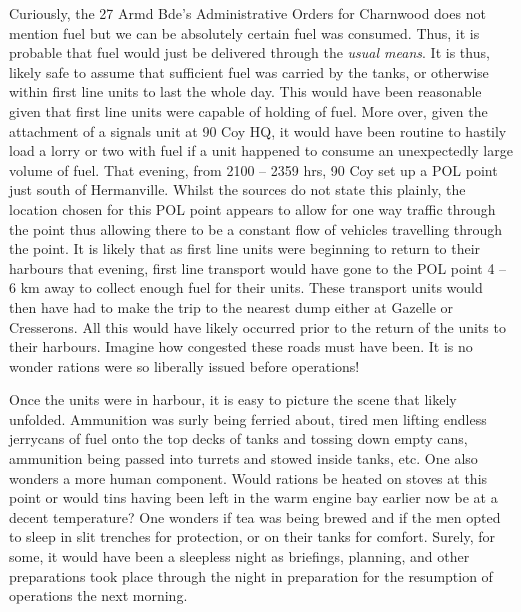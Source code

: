 \documentclass[noraggedright]{turabian-researchpaper}
\begin{document}
Curiously, the 27 Armd Bde's Administrative Orders for Charnwood does not
mention fuel but we can be absolutely certain fuel was consumed.  Thus, it is
probable that fuel would just be delivered through the \textit{usual means}.
It is thus, likely safe to assume that sufficient fuel was
carried by the tanks, or otherwise within first line units to last the whole
day.    This would have been reasonable given that first line units were 
capable of holding %
of fuel.  More over, given the attachment of a signals unit at 90 Coy HQ, it
would have been routine to hastily load a lorry or two with fuel if a unit
happened to consume an unexpectedly large volume of fuel.
That evening, from 2100 -- 2359 hrs,
90 Coy set up a POL point just south of Hermanville.\autocite[8 July 1944]
{90wd}
Whilst the sources do not state this plainly, the location chosen for this
POL point appears to allow for one way traffic through the point thus allowing
there to be a constant flow of vehicles travelling through the point.  It is 
likely that as first line units were beginning to return to their harbours that 
evening, first line transport would have gone to the POL point 4 -- 6 km away 
to collect enough fuel for their units.  These transport units would then have 
had to make the trip to the nearest dump either at Gazelle or Cresserons.  All
this would have likely occurred prior to the return of the units to their 
harbours.
Imagine how congested these roads must have been.  It is no wonder rations 
were so liberally issued before operations!   

Once the units were in harbour, it is easy to picture the scene that likely
unfolded.  Ammunition was surly being ferried about, tired men lifting 
endless jerrycans of fuel onto the top decks of tanks and tossing down empty
cans, ammunition being passed into turrets and stowed inside tanks, etc. 
One also wonders a more human
component.  Would rations be heated on stoves at this point or would tins 
having been left in the warm engine bay earlier now be at a decent 
temperature?  One wonders if tea was being brewed and if the men opted to sleep
in slit trenches for protection, or on their tanks for comfort.  Surely, for
some, it would have been a sleepless night as briefings, planning, and other
preparations took place through the night in  preparation for the resumption 
of operations the next morning.
\end{document}
